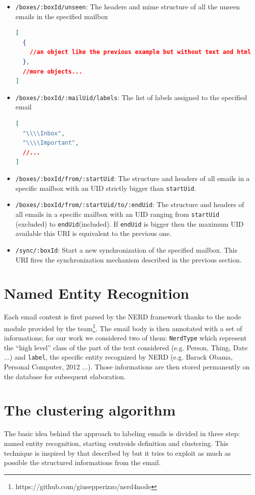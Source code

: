 \documentclass[a4paper,12pt]{report}
\begin{document}
\begin{itemize}
\begin{lstlisting}[language=JSON]
  ]
}
\end{lstlisting}
\item \texttt{/boxes/:boxId/unseen}: The headers and mime structure of  all the unseen emails in the specified mailbox
\begin{lstlisting}[language=JSON]
[
  {
    //an object like the previous example but without text and html 
  },
  //more objects...
]
\end{lstlisting}
\item \texttt{/boxes/:boxId/:mailUid/labels}: The list of labels assigned to the specified email
\begin{lstlisting}[language=JSON]
[
  "\\\\Inbox",
  "\\\\Important",
  //...
]
\end{lstlisting}
\item \texttt{/boxes/:boxId/from/:startUid}: The structure and headers of all emails in a specific mailbox with an UID strictly bigger than \texttt{startUid}.
\item \texttt{/boxes/:boxId/from/:startUid/to/:endUid}: The structure and headers of all emails in a specific mailbox with an UID ranging from \texttt{startUid} (excluded) to \texttt{endUid}(included). If \texttt{endUid} is bigger then the maximum UID available this URI is equivalent to the previous one.
\item \texttt{/sync/:boxId}: Start a new synchronization of the specified mailbox. This URI fires the synchronization mechanism described in the previous section.
\end{itemize}

\section{Named Entity Recognition}
Each email content is first parsed by the NERD framework thanks to the node module provided by the team\footnote{https://github.com/giusepperizzo/nerd4node}. The email body is then annotated with a set of informations; for our work we considered two of them: \texttt{NerdType} which represent the ``high level'' class of the part of the text considered (e.g. Person, Thing, Date ...) and \texttt{label}, the specific entity recognized by NERD (e.g. Barack Obama, Personal Computer, 2012 ...). 
Those informations are then stored permanently on the database for subsequent elaboration.

\section{The clustering algorithm}
The basic idea behind the approach to labeling emails is divided in three step: named entity recognition, starting centroids definition and clustering. This technique is inspired by that described by \cite{Manco2008} but it tries to exploit as much as possible the structured informations from the email.
\end{document}
